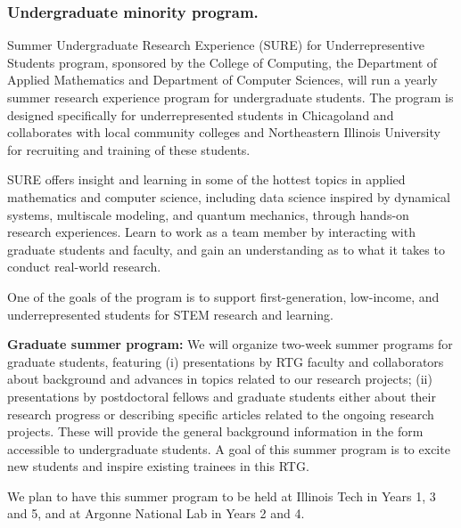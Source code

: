 \documentclass[11pt]{NSFamsart}
\begin{document}

\subsubsection*{Undergraduate minority program.} Summer Undergraduate Research Experience (SURE) for Underrepresentive Students program,   
sponsored by the College of Computing, the Department of Applied
Mathematics and Department of Computer Sciences, will run a yearly
summer research experience program for undergraduate students.
The program is designed specifically for underrepresented students in Chicagoland and 
  collaborates with local community colleges and Northeastern Illinois University for recruiting
and training of these students.

SURE offers insight and learning in some of the hottest topics in
applied mathematics and computer science, including data science inspired by dynamical systems, multiscale modeling, and quantum mechanics,   through hands-on research
experiences. Learn to work as a team member by interacting with graduate
students and faculty, and gain an understanding as to what it takes to
conduct real-world research.

One of the goals of the program is to support first-generation,
low-income, and underrepresented students for STEM research and learning.

 
 
\noindent
\textbf{Graduate summer program:} We will organize two-week summer programs for  graduate students, featuring (i) presentations by RTG faculty and collaborators about background and advances  in topics related to our research  projects; (ii) presentations by postdoctoral fellows and graduate students either about their research progress or describing specific articles related to the ongoing research projects. These will provide the general background
information in the form accessible to undergraduate students.  A goal of   this summer program is to excite new students and inspire existing trainees in this RTG. 

We plan to have this summer program to be held at Illinois Tech in Years 1, 3 and 5, and at Argonne National Lab in Years 2 and 4. 
\end{document}
